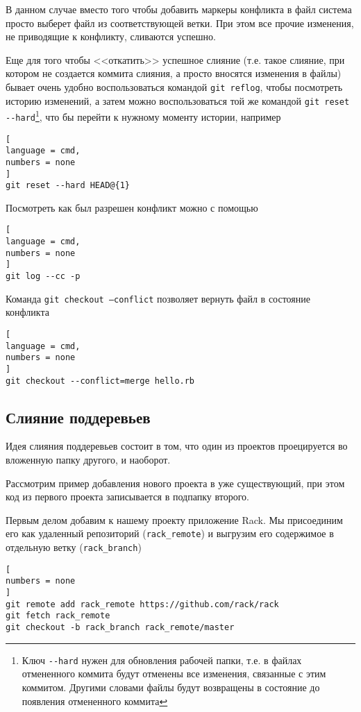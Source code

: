 \documentclass[%
	11pt,
	a4paper,
	utf8,
		]{article}
\begin{document}
В данном случае вместо того чтобы добавить маркеры конфликта в файл система просто выберет файл из соответствующей ветки. При этом все прочие изменения, не приводящие к конфликту, сливаются успешно.

Еще для того чтобы <<откатить>> успешное слияние (т.е. такое слияние, при котором не создается коммита слияния, а просто вносятся изменения в файлы) бывает очень удобно воспользоваться командой \texttt{git reflog}, чтобы посмотреть историю изменений, а затем можно воспользоваться той же командой \verb|git reset --hard|\footnote{Ключ \texttt{-}\texttt{-hard} нужен для обновления рабочей папки, т.е. в файлах отмененного коммита будут отменены все изменения, связанные с этим коммитом. Другими словами файлы будут возвращены в состояние до появления отмененного коммита}, что бы перейти к нужному моменту истории, например
\begin{lstlisting}[
language = cmd,
numbers = none
]
git reset --hard HEAD@{1}
\end{lstlisting}

Посмотреть как был разрешен конфликт можно с помощью 
\begin{lstlisting}[
language = cmd,
numbers = none
]
git log --cc -p
\end{lstlisting}

Команда \texttt{git checkout --conflict} позволяет вернуть файл в состояние конфликта
\begin{lstlisting}[
language = cmd,
numbers = none
]
git checkout --conflict=merge hello.rb
\end{lstlisting}

\subsection{Слияние поддеревьев}

Идея слияния поддеревьев состоит в том, что один из проектов проецируется во вложенную папку другого, и наоборот.

Рассмотрим пример добавления нового проекта в уже существующий, при этом код из первого проекта записывается в подпапку второго.

Первым делом добавим к нашему проекту приложение Rack. Мы присоединим его как удаленный репозиторий (\texttt{rack\_remote}) и выгрузим его содержимое в отдельную ветку (\texttt{rack\_branch})
\begin{lstlisting}[
numbers = none
]
git remote add rack_remote https://github.com/rack/rack
git fetch rack_remote
git checkout -b rack_branch rack_remote/master
\end{lstlisting}
\end{document}
